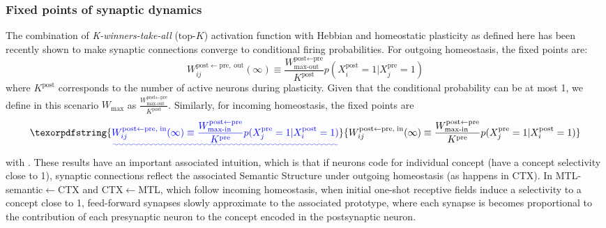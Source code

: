 \documentclass{article}
\providecommand{\DIFaddtex}[1]{{\protect\color{blue}\uwave{#1}}} %
\providecommand{\DIFaddbegin}{} %
\providecommand{\DIFaddend}{} %
\providecommand{\DIFadd}[1]{\texorpdfstring{\DIFaddtex{#1}}{#1}} %
\begin{document}
\subsubsection*{Fixed points of synaptic dynamics}
The combination of \textit{K-winners-take-all} ($\textrm{top-}K$) activation function with Hebbian and homeostatic plasticity as defined here has been recently shown  to make synaptic connections converge to conditional firing probabilities. For outgoing homeostasis, the fixed points are:
  \begin{equation}
     W_{ij}^{\textrm{post}\leftarrow\textrm{pre}, \; \textrm{out}}(\infty) \equiv \frac{W_\textrm{max-out}^{\textrm{post}\leftarrow\textrm{pre}}}{K^\textrm{post}}p(X^\textrm{post}_i = 1| X^\textrm{pre}_j = 1)
 \end{equation}
 where $K^\textrm{post}$ corresponds to the number of active neurons during plasticity. Given that the conditional probability can be at most 1, we define in this scenario $W_\textrm{max}$ as $\frac{W_\textrm{max-out}^{\textrm{post}\leftarrow\textrm{pre}}}{K^\textrm{post}}$. Similarly, for incoming homeostasis, the fixed points are
    \DIFaddbegin \begin{equation}
   \DIFadd{W_{ij}^{\textrm{post}\leftarrow\textrm{pre}, \; \textrm{in}}(\infty) \equiv \frac{W_\textrm{max-in}^{\textrm{post}\leftarrow\textrm{pre}}}{K^\textrm{pre}}p(X^\textrm{pre}_j = 1| X^\textrm{post}_i = 1)
 }\end{equation}\DIFaddend 
 with  \DIFaddbegin \DIFadd{$W_\textrm{max}=\frac{W_\textrm{max-in}^{\textrm{post}\leftarrow\textrm{pre}}}{K^\textrm{pre}}$}\DIFaddend . These results have an important associated intuition, which is that if neurons code for individual concept (have a concept selectivity close to 1), synaptic connections reflect the associated Semantic Structure  under outgoing homeostasis (as happens in CTX). In MTL-semantic$\leftarrow$CTX and CTX$\leftarrow$MTL, which follow incoming homeostasis, when initial one-shot receptive fields induce a selectivity to a concept close to 1, feed-forward synapses slowly approximate to the associated prototype, where each synapse is becomes proportional to the contribution of each presynaptic neuron to the concept encoded in the postsynaptic neuron.
\end{document}
